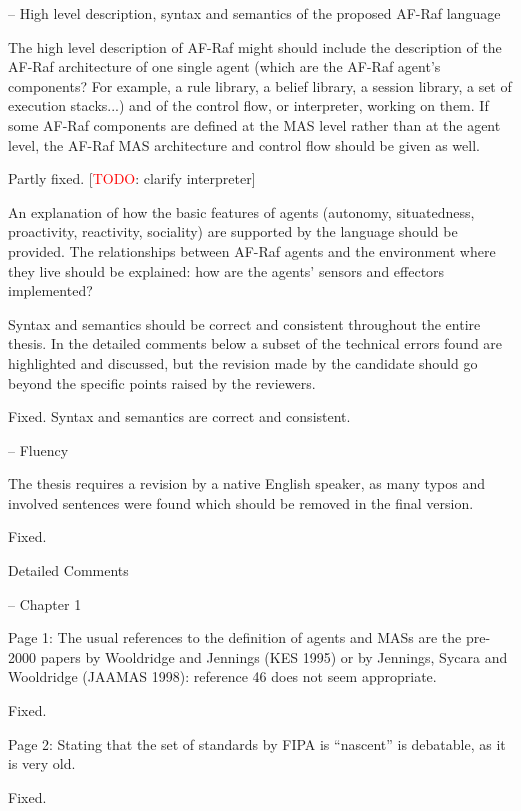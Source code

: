 \documentclass{article}
\newcommand{\todo}[1]{[\textcolor{red}{TODO}: #1]}
\newenvironment{them}{\noindent\begingroup\color{blue}}{\endgroup\par}
\begin{document}
\begin{them}
-- High level description, syntax and semantics of the proposed AF-Raf language

The high level description of AF-Raf might should include the description of the AF-Raf architecture of one single agent (which are the AF-Raf agent's components? For example, a rule library, a belief library, a session library, a set of execution stacks...) and of the control flow, or interpreter, working on them. If some AF-Raf components are defined at the MAS level rather than at the agent level, the AF-Raf MAS architecture and control flow should be given as well.
\end{them}
Partly fixed.
\todo{clarify interpreter}

\begin{them}
An explanation of how the basic features of agents (autonomy, situatedness, proactivity, reactivity, sociality) are supported by the language should be provided. The relationships between AF-Raf agents and the environment where they live should be explained: how are the agents' sensors and effectors implemented? 
\end{them}
\todo{clarify this}

\begin{them}
Syntax and semantics should be correct and consistent throughout the entire thesis. In the detailed comments below a subset of the technical errors found are highlighted and discussed, but the revision made by the candidate should go beyond the specific points raised by the reviewers.
\end{them}
Fixed. Syntax and semantics are correct and consistent.

\begin{them}
-- Fluency

The thesis requires a revision by a native English speaker, as many typos and involved sentences were found which should be removed in the final version.
\end{them}
Fixed.

\begin{them}
Detailed Comments

-- Chapter 1

Page 1:
The usual references to the definition of agents and MASs are the pre-2000 papers by Wooldridge
and Jennings (KES 1995) or by Jennings, Sycara and Wooldridge (JAAMAS 1998): reference 46 does
not seem appropriate.
\end{them}
Fixed.

\begin{them}
Page 2:
Stating that the set of standards by FIPA is “nascent” is debatable, as it is very old.
\end{them}
Fixed.
\end{document}

